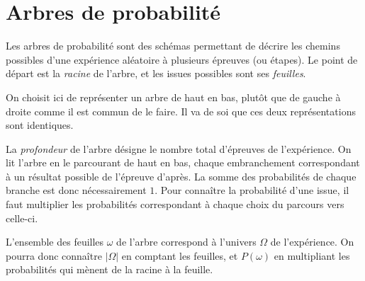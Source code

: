 \section{Arbres de probabilité}

Les arbres de probabilité sont des schémas permettant de décrire les chemins possibles d'une expérience aléatoire à plusieurs épreuves (ou étapes).
Le point de départ est la \emph{racine} de l'arbre, et les issues possibles sont ses \emph{feuilles}.

On choisit ici de représenter un arbre de haut en bas, plutôt que de gauche à droite comme il est commun de le faire.
Il va de soi que ces deux représentations sont identiques.

La \emph{profondeur} de l'arbre désigne le nombre total d'épreuves de l'expérience.
On lit l'arbre en le parcourant de haut en bas, chaque embranchement correspondant à un résultat possible de l'épreuve d'après.
La somme des probabilités de chaque branche est donc nécessairement $1$.
Pour connaître la probabilité d'une issue, il faut multiplier les probabilités correspondant à chaque choix du parcours vers celle-ci.

L'ensemble des feuilles $\omega$ de l'arbre correspond à l'univers $\Omega$ de l'expérience.
On pourra donc connaître $|\Omega|$ en comptant les feuilles, et $P(\omega)$ en multipliant les probabilités qui mènent de la racine à la feuille.

